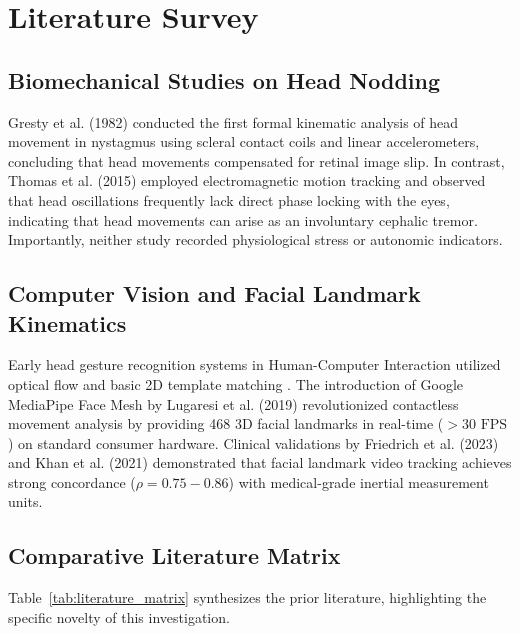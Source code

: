 \documentclass[12pt,a4paper,oneside]{report}
\begin{document}
\chapter{Literature Survey}
\label{chap:literature_survey}

\section{Biomechanical Studies on Head Nodding}
Gresty et al. (1982) \cite{gresty1982} conducted the first formal kinematic analysis of head movement in nystagmus using scleral contact coils and linear accelerometers, concluding that head movements compensated for retinal image slip. In contrast, Thomas et al. (2015) \cite{thomas2015} employed electromagnetic motion tracking and observed that head oscillations frequently lack direct phase locking with the eyes, indicating that head movements can arise as an involuntary cephalic tremor. Importantly, neither study recorded physiological stress or autonomic indicators.

\section{Computer Vision and Facial Landmark Kinematics}
Early head gesture recognition systems in Human-Computer Interaction utilized optical flow and basic 2D template matching \cite{kapoor2001, morency2005}. The introduction of Google MediaPipe Face Mesh by Lugaresi et al. (2019) \cite{lugaresi2019} revolutionized contactless movement analysis by providing 468 3D facial landmarks in real-time ($>30\text{ FPS}$) on standard consumer hardware. Clinical validations by Friedrich et al. (2023) \cite{friedrich2023} and Khan et al. (2021) \cite{khan2021} demonstrated that facial landmark video tracking achieves strong concordance ($\rho = 0.75 - 0.86$) with medical-grade inertial measurement units.

\section{Comparative Literature Matrix}
Table~\ref{tab:literature_matrix} synthesizes the prior literature, highlighting the specific novelty of this investigation.
\end{document}
